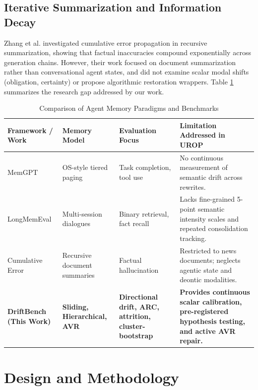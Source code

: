 \documentclass[12pt,a4paper]{report}
\begin{document}
\section{Iterative Summarization and Information Decay}
Zhang et al. \cite{zhang2024cumulative} investigated cumulative error propagation in recursive summarization, showing that factual inaccuracies compound exponentially across generation chains. However, their work focused on document summarization rather than conversational agent states, and did not examine scalar modal shifts (obligation, certainty) or propose algorithmic restoration wrappers. Table \ref{tab:lit_survey} summarizes the research gap addressed by our work.

\begin{table}[htbp]
\centering
\small
\caption{Comparison of Agent Memory Paradigms and Benchmarks}
\label{tab:lit_survey}
\begin{tabularx}{\textwidth}{p{3.2cm}p{2.8cm}p{3.2cm}X}
\toprule
\textbf{Framework / Work} & \textbf{Memory Model} & \textbf{Evaluation Focus} & \textbf{Limitation Addressed in UROP} \\
\midrule
MemGPT \cite{packer2023memgpt} & OS-style tiered paging & Task completion, tool use & No continuous measurement of semantic drift across rewrites. \\
LongMemEval \cite{wu2024longmemeval} & Multi-session dialogues & Binary retrieval, fact recall & Lacks fine-grained 5-point semantic intensity scales and repeated consolidation tracking. \\
Cumulative Error \cite{zhang2024cumulative} & Recursive document summaries & Factual hallucination & Restricted to news documents; neglects agentic state and deontic modalities. \\
\textbf{DriftBench (This Work)} & \textbf{Sliding, Hierarchical, AVR} & \textbf{Directional drift, ARC, attrition, cluster-bootstrap} & \textbf{Provides continuous scalar calibration, pre-registered hypothesis testing, and active AVR repair.} \\
\bottomrule
\end{tabularx}
\end{table}

\chapter{Design and Methodology}
\end{document}
